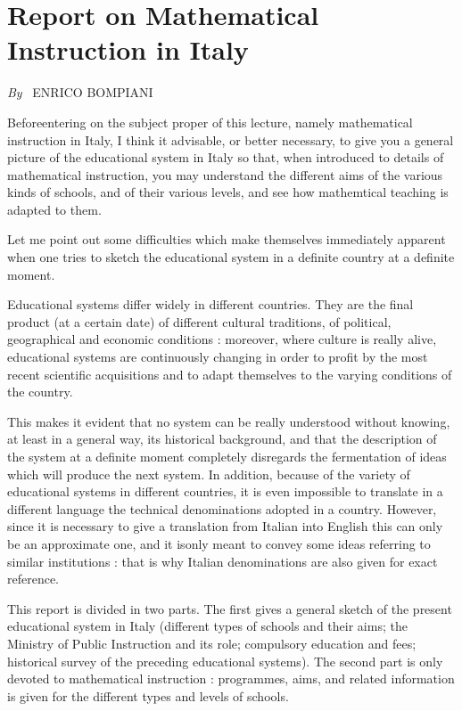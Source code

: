 \chapter{Report on Mathematical Instruction in Italy}

\begin{center}
{\em By}~ ENRICO BOMPIANI
\end{center}

\setcounter{pageoriginal}{110}
Before\pageoriginale entering on the subject proper of this lecture, namely mathematical instruction in Italy, I think it advisable, or better necessary, to give you a general picture of the educational system in Italy so that, when introduced to details of mathematical instruction, you may understand the different aims of the various kinds of schools, and of their various levels, and see how mathemtical teaching is adapted to them.

Let me point out some difficulties which make themselves immediately apparent when one tries to sketch the educational system in a definite country at a definite moment.

Educational systems differ widely in different countries. They are the final product (at a certain date) of different cultural traditions, of political, geographical and economic conditions : moreover, where culture is really alive, educational systems are continuously changing in order to profit by the most recent scientific acquisitions and to adapt themselves to the varying conditions of the country.

This makes it evident that no system can be really understood without knowing, at least in a general way, its historical background, and that the description of the system at a definite moment completely disregards the fermentation of ideas which will produce the next system. In addition, because of the variety of educational systems in different countries, it is even impossible to translate in a different language the technical denominations adopted in a country. However, since it is necessary to give a translation from Italian into English this can only be an approximate one, and it is\pageoriginale only meant to convey some ideas referring to similar institutions : that is why Italian denominations are also given for exact reference.

This report is divided in two parts. The first gives a general sketch of the present educational system in Italy (different types of schools and their aims; the Ministry of Public Instruction and its role; compulsory education and fees; historical survey of the preceding educational systems). The second part is only devoted to mathematical instruction : programmes, aims, and related information is given for the different types and levels of schools.

